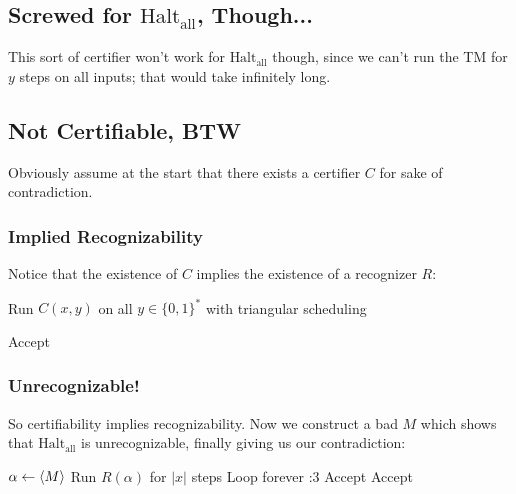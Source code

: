 \documentclass[12pt]{article}
\begin{document}
\subsection{Screwed for \texorpdfstring{$\text{Halt}_\text{all}$}{Halt\_all}, Though...}

This sort of certifier won't work for $\text{Halt}_\text{all}$ though,
since we can't run the TM for $y$ steps on all inputs; that would take infinitely long.

\pagebreak

\subsection{Not Certifiable, BTW}

Obviously assume at the start that there exists a certifier $C$ for sake of contradiction.

\subsubsection{Implied Recognizability}

Notice that the existence of $C$ implies the existence of a recognizer $R$:
\begin{algorithmic}[1]
        \State Run $C(x, y)$ on all $y \in \{0, 1\}^*$ with triangular scheduling
        
            \State Accept
        \Else
        \EndIf
    \EndProcedure
\end{algorithmic}

\subsubsection{Unrecognizable!}

So certifiability implies recognizability.
Now we construct a bad $M$ which shows that $\text{Halt}_\text{all}$ is
unrecognizable, finally giving us our contradiction:
\begin{algorithmic}[1]
        \State $\alpha \gets \Braket{M}$
        \State Run $R(\alpha)$ for $|x|$ steps
            \State Loop forever :3
            \State Accept
            \State Accept
        \EndIf
    \EndProcedure
\end{algorithmic}
\end{document}
